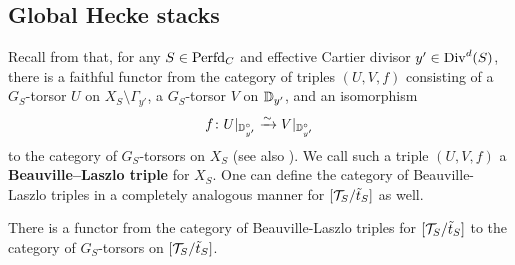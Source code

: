 \subsection{Global Hecke stacks}

Recall from \cite[Proposition 19.1.2]{SW20} that, for any $S \in \mathrm{Perfd}_{C}$ and effective Cartier divisor $y' \in \mathrm{Div}^{d}(S)$, there is a faithful functor from the category of triples $(U,V,f)$ consisting of a $G_{S}$-torsor $U$ on $X_{S} \setminus \Gamma_{y'}$, a $G_{S}$-torsor $V$ on $\mathbb D_{y'}$, and an isomorphism 
\begin{equation*}
f \colon U|_{\mathbb D_{y'}^{\circ}} \xrightarrow{\sim} V|_{\mathbb D_{y'}^{\circ}}
\end{equation*}
to the category of $G_{S}$-torsors on $X_{S}$ (see also \cite[\S III.3]{Geometrization}). We call such a triple $(U,V,f)$ a \textbf{Beauville--Laszlo triple} for $X_{S}$. One can define the category of Beauville-Laszlo triples in a completely analogous manner for $[\mathcal{T}_{S}/\tilde{t}_{S}]$ as well.

\begin{lem}\label{lem:GerbeBL}
There is a functor from the category of Beauville-Laszlo triples for $[\mathcal{T}_{S}/\tilde{t}_{S}]$ to the category of $G_{S}$-torsors on $[\mathcal{T}_{S}/\tilde{t}_{S}]$.
\end{lem}

